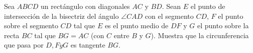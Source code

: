 Sea $ABCD$ un rectángulo con diagonales $AC$ y $BD$. Sean $E$ el punto de intersección de la bisectriz del ángulo $\angle CAD$ con el segmento $CD$, $F$ el punto sobre el segmento $CD$ tal que $E$ es el punto medio de $DF$ y $G$ el punto sobre la recta $BC$ tal que $BG = AC$ (con $C$ entre $B$ y $G$).
Muestra que la circunferencia que pasa por $D, F y G$ es tangente $BG$.